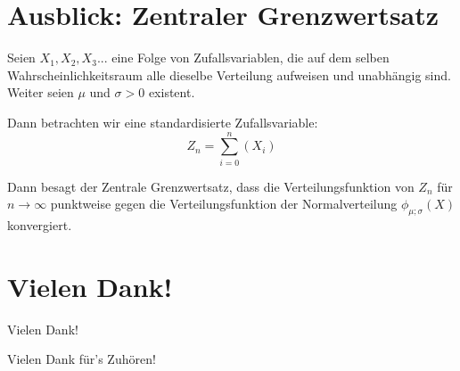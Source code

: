 \documentclass[14pt]{beamer}
\begin{document}
\section{Ausblick: Zentraler Grenzwertsatz}

\begin{frame}

Seien $X_1, X_2, X_3 ...$ eine Folge von Zufallsvariablen, die auf dem selben Wahrscheinlichkeitsraum alle dieselbe Verteilung aufweisen und unabhängig sind. Weiter seien $\mu$ und $\sigma > 0$ existent.

Dann betrachten wir eine standardisierte Zufallsvariable:
$$ Z_n = \sum_{i = 0}^n(X_i)$$

\end{frame}
\begin{frame}

Dann besagt der Zentrale Grenzwertsatz, dass die Verteilungsfunktion von $Z_n$ für $n \rightarrow \infty$ punktweise gegen die Verteilungsfunktion der Normalverteilung $\phi_{\mu;\sigma}(X)$ konvergiert. 

\end{frame}

\section{Vielen Dank!}
\begin{frame}{Vielen Dank!}
\begin{center}
\parskip 15pt
Vielen Dank für's Zuhören!
\end{center}
\end{frame}
\end{document}

